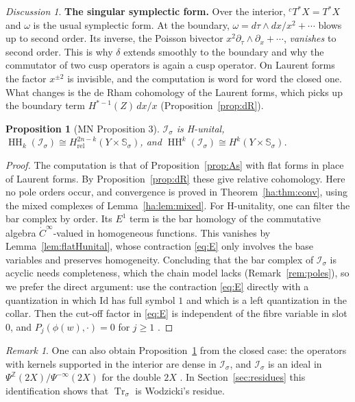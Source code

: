 \documentclass[11pt,oneside,reqno]{article}
\DeclareMathOperator{\HH}{HH}
\DeclareMathOperator{\Tr}{Tr}
\newcommand{\Z}{\mathbb Z}
\newcommand{\Is}{\mathcal I_\sigma}
\newcommand{\Trs}{\Tr_\sigma}
\newcommand{\dCI}{\dot C^\infty}
\newcommand{\cT}{{}^cT^*X}
\newcommand{\Ssig}{\mathbb S_\sigma}
\newcommand{\Hrel}{H_{\mathrm{rel}}}
\theoremstyle{plain}
\newtheorem{proposition}[theorem]{Proposition}
\theoremstyle{definition}
\theoremstyle{remark}
\newtheorem{remark}[theorem]{Remark}
\newtheorem*{discussion}{Discussion}
\begin{document}
\begin{discussion}
\textbf{The singular symplectic form.} Over the interior, \(\cT=T^*X\)
and \(\omega\) is the usual symplectic form. At the boundary,
\(\omega=d\tau\wedge dx/x^2+\cdots\) blows up to second order. Its inverse,
the Poisson bivector \(x^2\partial_\tau\wedge\partial_x+\cdots\),
\emph{vanishes} to second order. This is why \(\delta\) extends smoothly
to the boundary and why the commutator of two cusp operators is again a
cusp operator. On Laurent forms the factor \(x^{\pm2}\) is invisible, and
the computation is word for word the closed one. What changes is the
de Rham cohomology of the Laurent forms, which picks up the boundary term
\(H^{*-1}(Z)\,dx/x\) (Proposition~\ref{prop:dR}).
\end{discussion}

\begin{proposition}[MN Proposition 3]\label{prop:Is}
\(\Is\) is H-unital, \(\HH_k(\Is)\cong\Hrel^{2n-k}(Y\times\Ssig)\), and
\(\HH^k(\Is)\cong H^k(Y\times\Ssig)\).
\end{proposition}

\begin{proof}
The computation is that of Proposition~\ref{prop:As} with flat forms in
place of Laurent forms. By Proposition~\ref{prop:dR} these give relative
cohomology. Here no pole orders occur, and convergence is proved in
Theorem~\ref{ha:thm:conv}, using the mixed complexes of
Lemma~\ref{ha:lem:mixed}. For H-unitality, one can filter the bar complex
by order. Its \(E^1\) term is the bar homology of the commutative algebra
\(\dCI\)-valued in homogeneous functions. This vanishes by
Lemma~\ref{lem:flatHunital}, whose contraction \eqref{eq:E} only involves
the base variables and preserves homogeneity. Concluding that the bar
complex of \(\Is\) is acyclic needs completeness, which the chain model
lacks (Remark~\ref{rem:poles}), so we prefer the direct argument: use the
contraction
\eqref{eq:E} directly with a quantization in which \(\mathrm{Id}\) has
full symbol \(1\) and which is a left quantization in the collar. Then
the cut-off factor in \eqref{eq:E} is independent of the fibre variable
in slot \(0\), and \(P_j(\phi(w),\cdot)=0\) for \(j\ge1\)
\cite[p.~13]{MN}.
\end{proof}

\begin{remark}
One can also obtain Proposition~\ref{prop:Is} from the closed case: the
operators with kernels supported in the interior are dense in \(\Is\),
and \(\Is\) is an ideal in \(\Psi^{\Z}(2X)/\Psi^{-\infty}(2X)\) for the
double \(2X\) \cite[(47)]{MN}. In Section~\ref{sec:residues} this
identification shows that \(\Trs\) is Wodzicki's residue.
\end{remark}
\end{document}

